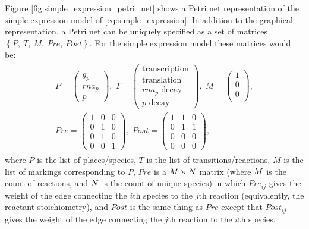 Figure \ref{fig:simple_expression_petri_net} shows a Petri net representation of the simple expression model of \eqref{eq:simple_expression}. In addition to the graphical representation, a Petri net can be uniquely specified as a set of matrices $\left\{P,\ T,\ M,\ Pre,\ Post \right\}$\supercite{Wilkinson:2012tt}. For the simple expression model these matrices would be:
\begin{gather}\label{eq:simple_expression_matrices}
\begin{split}
    P = \left( \begin{array}{c}
        g_p \\
        rna_p \\
        p
    \end{array} \right),\;
%
    T = \left( \begin{array}{c}
        \textrm{transcription} \\
        \textrm{translation} \\
        rna_p \textrm{ decay} \\
        p \textrm{ decay}
    \end{array} \right),\;
%
    M = \left( \begin{array}{c}
        1 \\
        0 \\
        0 \\
    \end{array} \right),\\
%
Pre = \left( \begin{array}{ccc}
        1 & 0 & 0 \\
        0 & 1 & 0 \\
        0 & 1 & 0 \\
        0 & 0 & 1   
\end{array} \right),\;
%
    Post = \left( \begin{array}{ccc}
        1 & 1 & 0 \\
        0 & 1 & 1 \\
        0 & 0 & 0 \\
        0 & 0 & 0
    \end{array} \right),\;
\end{split}
\end{gather}
where $P$ is the list of places/species, $T$ is the list of transitions/reactions, $M$ is the list of markings corresponding to $P$, $Pre$ is a $M \times N$ matrix (where $M$ is the count of reactions, and $N$ is the count of unique species) in which $Pre_{ij}$ gives the weight of the edge connecting the $i$th species to the $j$th reaction (equivalently, the reactant stoichiometry), and $Post$ is the same thing as $Pre$ except that $Post_{ij}$ gives the weight of the edge connecting the $j$th reaction to the $i$th species.

